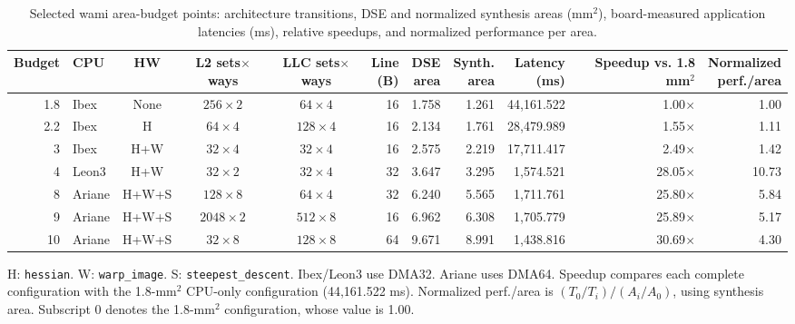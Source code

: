 \begin{table}[t]
\centering
\caption{Selected wami area-budget points: architecture transitions, DSE and normalized synthesis areas (mm$^2$), board-measured application latencies (ms), relative speedups, and normalized performance per area.}
\label{tab:wami_budget_configs}
\footnotesize
\renewcommand{\arraystretch}{1.14}
\setlength{\tabcolsep}{3pt}
\begin{tabular*}{\textwidth}{@{\extracolsep{\fill}}rlcccrrrrrr@{}}
\toprule
\textbf{Budget} & \textbf{CPU} & \textbf{HW} & \shortstack{\textbf{L2}\\\textbf{sets$\times$ways}} & \shortstack{\textbf{LLC}\\\textbf{sets$\times$ways}} & \shortstack{\textbf{Line}\\\textbf{(B)}} & \shortstack{\textbf{DSE}\\\textbf{area}} & \shortstack{\textbf{Synth.}\\\textbf{area}} & \shortstack{\textbf{Latency}\\\textbf{(ms)}} & \shortstack{\textbf{Speedup}\\\textbf{vs. 1.8 mm$^2$}} & \shortstack{\textbf{Normalized}\\\textbf{perf./area}} \\
\midrule
1.8 & Ibex & None & $256\times2$ & $64\times4$ & 16 & 1.758 & 1.261 & 44,161.522 & 1.00$\times$ & 1.00 \\
2.2 & Ibex & H & $64\times4$ & $128\times4$ & 16 & 2.134 & 1.761 & 28,479.989 & 1.55$\times$ & 1.11 \\
3 & Ibex & H+W & $32\times4$ & $32\times4$ & 16 & 2.575 & 2.219 & 17,711.417 & 2.49$\times$ & 1.42 \\
4 & Leon3 & H+W & $32\times2$ & $32\times4$ & 32 & 3.647 & 3.295 & 1,574.521 & 28.05$\times$ & 10.73 \\
8 & Ariane & H+W+S & $128\times8$ & $64\times4$ & 32 & 6.240 & 5.565 & 1,711.761 & 25.80$\times$ & 5.84 \\
9 & Ariane & H+W+S & $2048\times2$ & $512\times8$ & 16 & 6.962 & 6.308 & 1,705.779 & 25.89$\times$ & 5.17 \\
10 & Ariane & H+W+S & $32\times8$ & $128\times8$ & 64 & 9.671 & 8.991 & 1,438.816 & 30.69$\times$ & 4.30 \\
\bottomrule
\end{tabular*}
\par\vspace{6pt}\noindent
\parbox{\textwidth}{\scriptsize H: \texttt{hessian}. W: \texttt{warp\_image}. S: \texttt{steepest\_descent}. Ibex/Leon3 use DMA32. Ariane uses DMA64. Speedup compares each complete configuration with the 1.8-mm$^2$ CPU-only configuration (44,161.522 ms). Normalized perf./area is $(T_0/T_i)/(A_i/A_0)$, using synthesis area. Subscript 0 denotes the 1.8-mm$^2$ configuration, whose value is 1.00.}
\end{table}
